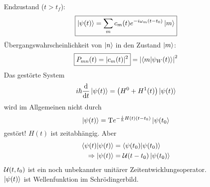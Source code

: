	Endzustand ($t>t_f$):
		\begin{equation*}
			\boxed{ \ket{\psi(t)} = 
			\sum_m c_m(t) e^{-i \omega_m (t-t_0)} \ket{m}
			}
		\end{equation*}
	Übergangswahrscheinlichkeit von $\ket{n}$ in den Zustand $\ket{m}$:
		\begin{equation*}
			\boxed{P_{mn} (t) = |c_m(t)|^2} = \left| \braket{m | \psi_W(t)}\right|^2
		\end{equation*}
	Das gestörte System
		\begin{equation*}
			i \hbar \frac{\mathrm{d}}{\mathrm{d} t} \ket{\psi(t)}
			= \left( H^0 + H^1(t) \right) \ket{\psi(t)}
		\end{equation*}
	wird im Allgemeinen nicht durch
		\begin{equation*}
			\ket{\psi(t)} = \mathrm{T} e^{-\frac{i}{\hbar} H(t) (t-t_0)} \ket{\psi(t_0}
		\end{equation*}
	gestört! $H(t)$ ist zeitabhängig.
	Aber 
		\begin{align*}
			\braket{\psi(t) | \psi(t)} &= \braket{\psi(t_0) | \psi(t_0)} \\
			\Rightarrow \ket{\psi(t)} &= \mathcal{U}(t-t_0) \ket{\psi(t_0)}
		\end{align*}
	$\mathcal{U}(t,t_0)$ ist ein noch unbekannter unitärer Zeitentwicklungsoperator.\\
	$\ket{\psi(t)}$ ist Wellenfunktion im Schrödingerbild.
	
